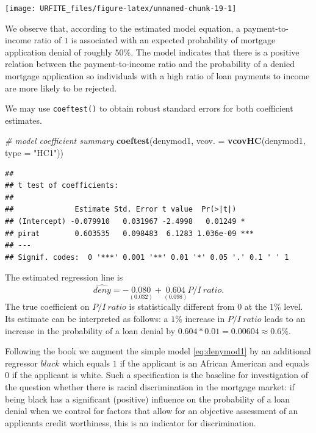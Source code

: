 \documentclass[]{book}
\newenvironment{Shaded}{\begin{snugshade}}{\end{snugshade}}
\newcommand{\KeywordTok}[1]{\textcolor[rgb]{0.13,0.29,0.53}{\textbf{#1}}}
\newcommand{\DataTypeTok}[1]{\textcolor[rgb]{0.13,0.29,0.53}{#1}}
\newcommand{\StringTok}[1]{\textcolor[rgb]{0.31,0.60,0.02}{#1}}
\newcommand{\CommentTok}[1]{\textcolor[rgb]{0.56,0.35,0.01}{\textit{#1}}}
\newcommand{\NormalTok}[1]{#1}
\theoremstyle{definition}
\theoremstyle{definition}
\theoremstyle{definition}
\theoremstyle{remark}
\begin{document}
\begin{center}\texttt{[image: URFITE\_files/figure-latex/unnamed-chunk-19-1]} \end{center}

We observe that, according to the estimated model equation, a
payment-to-income ratio of \(1\) is associated with an expected
probability of mortgage application denial of roughly \(50\%\). The
model indicates that there is a positive relation between the
payment-to-income ratio and the probability of a denied mortgage
application so individuals with a high ratio of loan payments to income
are more likely to be rejected.

We may use \texttt{coeftest()} to obtain robust standard errors for both
coefficient estimates.

\begin{Shaded}
\begin{Highlighting}[]
\CommentTok{# model coefficient summary}
\KeywordTok{coeftest}\NormalTok{(denymod1, }\DataTypeTok{vcov. =} \KeywordTok{vcovHC}\NormalTok{(denymod1, }\DataTypeTok{type =} \StringTok{"HC1"}\NormalTok{))}
\end{Highlighting}
\end{Shaded}

\begin{verbatim}
## 
## t test of coefficients:
## 
##              Estimate Std. Error t value  Pr(>|t|)    
## (Intercept) -0.079910   0.031967 -2.4998   0.01249 *  
## pirat        0.603535   0.098483  6.1283 1.036e-09 ***
## ---
## Signif. codes:  0 '***' 0.001 '**' 0.01 '*' 0.05 '.' 0.1 ' ' 1
\end{verbatim}

The estimated regression line is
\[\widehat{deny} = -\underset{(0.032)}{0.080} + \underset{(0.098)}{0.604} P/I \ ratio.\]
The true coefficient on \(P/I \ ratio\) is statistically different from
\(0\) at the \(1\%\) level. Its estimate can be interpreted as follows:
a \(1\%\) increase in \(P/I \ ratio\) leads to an increase in the
probability of a loan denial by
\(0.604 * 0.01 = 0.00604 \approx 0.6\%\).

Following the book we augment the simple model \eqref{eq:denymod1} by an
additional regressor \(black\) which equals \(1\) if the applicant is an
African American and equals \(0\) if the applicant is white. Such a
specification is the baseline for investigation of the question whether
there is racial discrimination in the mortgage market: if being black
has a significant (positive) influence on the probability of a loan
denial when we control for factors that allow for an objective
assessment of an applicants credit worthiness, this is an indicator for
discrimination.
\end{document}
